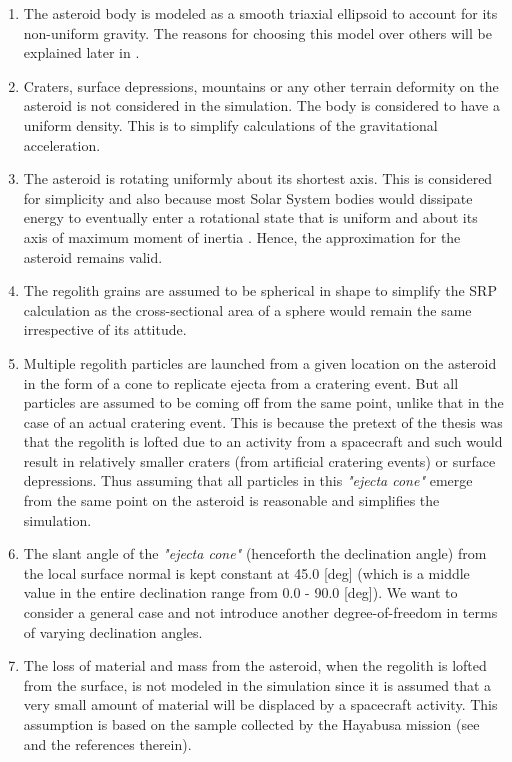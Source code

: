 \begin{enumerate}
\item The asteroid body is modeled as a smooth triaxial ellipsoid to account for its non-uniform gravity. The reasons for choosing this model over others will be explained later in .

\item Craters, surface depressions, mountains or any other terrain deformity on the asteroid is not considered in the simulation. The body is considered to have a uniform density. This is to simplify calculations of the gravitational acceleration.

\item The asteroid is rotating uniformly about its shortest axis. This is considered for simplicity and also because most Solar System bodies would dissipate energy to eventually enter a rotational state that is uniform and about its axis of maximum moment of inertia \parencite{scheeresBook}. Hence, the approximation for the asteroid remains valid.

\item The regolith grains are assumed to be spherical in shape to simplify the \gls{SRP} calculation as the cross-sectional area of a sphere would remain the same irrespective of its attitude.

\item Multiple regolith particles are launched from a given location on the asteroid in the form of a cone to replicate ejecta from a cratering event. But all particles are assumed to be coming off from the same point, unlike that in the case of an actual cratering event. This is because the pretext of the thesis was that the regolith is lofted due to an activity from a spacecraft and such would result in relatively smaller craters (from artificial cratering events) or surface depressions. Thus assuming that all particles in this \textit{"ejecta cone"} emerge from the same point on the asteroid is reasonable and simplifies the simulation.

\item The slant angle of the \textit{"ejecta cone"} (henceforth the declination angle) from the local surface normal is kept constant at 45.0 [deg] (which is a middle value in the entire declination range from 0.0 - 90.0 [deg]). We want to consider a general case and not introduce another degree-of-freedom in terms of varying declination angles.

\item The loss of material and mass from the asteroid, when the regolith is lofted from the surface, is not modeled in the simulation since it is assumed that a very small amount of material will be displaced by a spacecraft activity. This assumption is based on the sample collected by the Hayabusa mission (see  and the references therein).


\end{enumerate}
